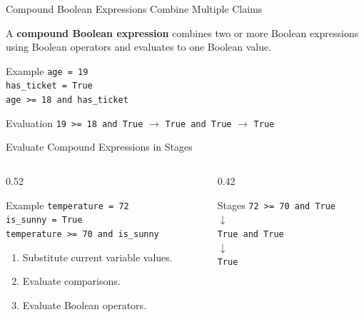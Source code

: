 \documentclass[aspectratio=169,10pt]{beamer}
\begin{document}

\begin{frame}{Compound Boolean Expressions Combine Multiple Claims}
  \begin{cpdefinition}
    A \textbf{compound Boolean expression} combines two or more Boolean expressions using Boolean operators and evaluates to one Boolean value.
  \end{cpdefinition}

  \begin{block}{Example}
    \texttt{age = 19}\\
    \texttt{has\_ticket = True}\\[0.08in]
    \texttt{age >= 18 and has\_ticket}
  \end{block}

  \begin{block}{Evaluation}
    \centering
    \texttt{19 >= 18 and True} $\longrightarrow$ \texttt{True and True} $\longrightarrow$ \texttt{True}
  \end{block}
\end{frame}

\begin{frame}{Evaluate Compound Expressions in Stages}
  \begin{columns}[T,onlytextwidth]
    \begin{column}{0.52\textwidth}
      \begin{block}{Example}
        \texttt{temperature = 72}\\
        \texttt{is\_sunny = True}\\[0.08in]
        \texttt{temperature >= 70 and is\_sunny}
      \end{block}

      \begin{enumerate}
        \item Substitute current variable values.
        \item Evaluate comparisons.
        \item Evaluate Boolean operators.
      \end{enumerate}
    \end{column}

    \begin{column}{0.42\textwidth}
      \begin{block}{Stages}
        \texttt{72 >= 70 and True}\\
        $\downarrow$\\
        \texttt{True and True}\\
        $\downarrow$\\
        \texttt{True}
      \end{block}
    \end{column}
  \end{columns}
\end{frame}
\end{document}
